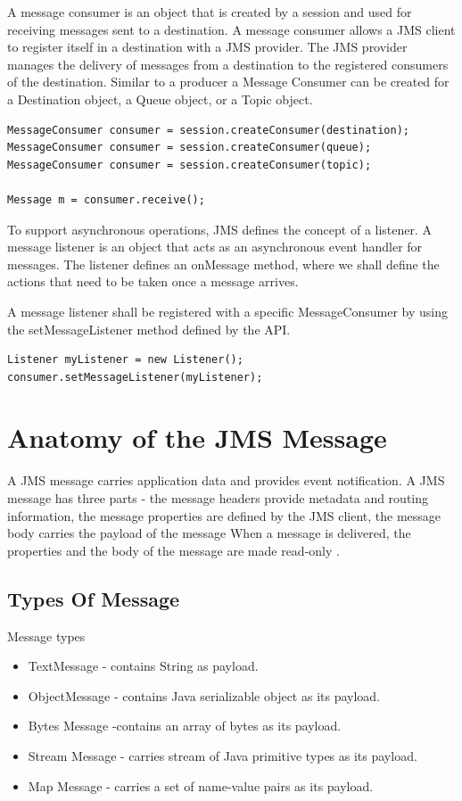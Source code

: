 \documentclass[9pt,twocolumn,twoside]{../../styles/osajnl}
\begin{document}
A message consumer is an object that is created by a session and used
for receiving messages sent to a destination.  A message consumer
allows a JMS client to register itself in a destination with a JMS
provider. The JMS provider manages the delivery of messages from a
destination to the registered consumers of the destination.  Similar
to a producer a Message Consumer can be created for a Destination
object, a Queue object, or a Topic object.

\begin{lstlisting}
MessageConsumer consumer = session.createConsumer(destination);
MessageConsumer consumer = session.createConsumer(queue);
MessageConsumer consumer = session.createConsumer(topic);

Message m = consumer.receive();
\end{lstlisting}

To support asynchronous operations, JMS defines the concept of a
listener.  A message listener is an object that acts as an
asynchronous event handler for messages. The listener defines an
onMessage method, where we shall define the actions that need to be
taken once a message arrives.

A message listener shall be registered with a specific MessageConsumer
by using the setMessageListener method defined by the API.

\begin{lstlisting}
Listener myListener = new Listener();
consumer.setMessageListener(myListener);
\end{lstlisting}

\section{Anatomy of the JMS Message}


A JMS message carries application data and provides event
notification.  A JMS message has three parts - the message headers
provide metadata and routing information, the message properties are
defined by the JMS client, the message body carries the payload of the
message When a message is delivered, the properties and the body of
the message are made read-only \cite{www-jms-fischli-article}.

\subsection{Types Of Message}

Message types
\begin{itemize}
\item TextMessage - contains String as payload.
\item ObjectMessage - contains Java serializable object as its payload.
\item Bytes Message -contains an array of bytes as its payload.
\item Stream Message - carries stream of Java primitive types as its payload.
\item Map Message - carries a set of name-value pairs as its payload.
\end{itemize}
\end{document}

